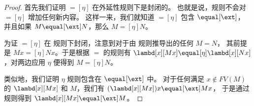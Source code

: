 \documentclass[../../../include/open-logic-section]{subfiles}
\begin{document}
\begin{proof}
  首先我们证明 $\equal[\eta]$ 在外延性规则下是封闭的。
  也就是说，\ext 规则不会对 $\equal[\eta]$ 增加任何新内容。
  这样一来，我们就知道 $\equal[\eta]$ 包含 $\equal[\ext]$，
  并且如果 $M \equal[\ext] N$，那么 $M \equal[\eta] N$。

  为证 $\equal[\eta]$ 在 \ext 规则下封闭，注意到对于由 \ext 规则推导出的任何 $M \equal N$，
  其前提是 $Mx \equal[\eta] Nx$。于是根据 $\equal$ 的规则有 $\lambd[x][Mx]
  \equal[\eta] \lambd[x][Nx]$，对两边应用 $\eta$
  便得到 $M \equal[\eta] N$。

  类似地，我们证明 $\eta$ 规则包含在 $\equal[\ext]$ 中。
  对于任何满足 $x \notin FV(M)$ 的 $\lambd[x][Mx]$ 和 $M$，我们有 $(\lambd[x][Mx])x \equal[\ext] Mx$，
  于是通过 \ext 规则得到 $\lambd[x][Mx] \equal[\ext] M$。
\end{proof}
\end{document}

